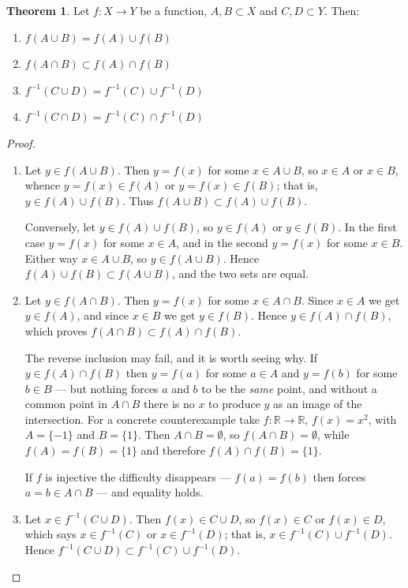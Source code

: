\documentclass[11pt,a4paper]{article}
\theoremstyle{definition}
\newtheorem{thm}{Theorem}[subsection]
\begin{document}
\begin{thm}\label{thm:image-props}
Let $f:X\longrightarrow Y$ be a function, $A,B\subset X$ and $C,D\subset Y$.
Then:
\begin{enumerate}
\item $f(A\cup B)=f(A)\cup f(B)$
\item $f(A\cap B)\subset f(A)\cap f(B)$
\item $f^{-1}(C\cup D)=f^{-1}(C)\cup f^{-1}(D)$
\item $f^{-1}(C\cap D)=f^{-1}(C)\cap f^{-1}(D)$
\end{enumerate}
\end{thm}

\begin{proof}
\begin{enumerate}
\item Let $y\in f(A\cup B)$. Then $y=f(x)$ for some $x\in A\cup B$, so $x\in A$
or $x\in B$, whence $y=f(x)\in f(A)$ or $y=f(x)\in f(B)$; that is,
$y\in f(A)\cup f(B)$. Thus $f(A\cup B)\subset f(A)\cup f(B)$.

Conversely, let $y\in f(A)\cup f(B)$, so $y\in f(A)$ or $y\in f(B)$. In the
first case $y=f(x)$ for some $x\in A$, and in the second $y=f(x)$ for some
$x\in B$. Either way $x\in A\cup B$, so $y\in f(A\cup B)$. Hence
$f(A)\cup f(B)\subset f(A\cup B)$, and the two sets are equal.

\item Let $y\in f(A\cap B)$. Then $y=f(x)$ for some $x\in A\cap B$. Since
$x\in A$ we get $y\in f(A)$, and since $x\in B$ we get $y\in f(B)$. Hence
$y\in f(A)\cap f(B)$, which proves $f(A\cap B)\subset f(A)\cap f(B)$.

The reverse inclusion may fail, and it is worth seeing why. If
$y\in f(A)\cap f(B)$ then $y=f(a)$ for some $a\in A$ and $y=f(b)$ for some
$b\in B$ --- but nothing forces $a$ and $b$ to be the \emph{same} point, and
without a common point in $A\cap B$ there is no $x$ to produce $y$ as an image
of the intersection. For a concrete counterexample take
$f:\mathbb{R}\to\mathbb{R}$, $f(x)=x^2$, with $A=\{-1\}$ and $B=\{1\}$. Then
$A\cap B=\emptyset$, so $f(A\cap B)=\emptyset$, while
$f(A)=f(B)=\{1\}$ and therefore $f(A)\cap f(B)=\{1\}$.

If $f$ is injective the difficulty disappears --- $f(a)=f(b)$ then forces
$a=b\in A\cap B$ --- and equality holds.

\item Let $x\in f^{-1}(C\cup D)$. Then $f(x)\in C\cup D$, so $f(x)\in C$ or
$f(x)\in D$, which says $x\in f^{-1}(C)$ or $x\in f^{-1}(D)$; that is,
$x\in f^{-1}(C)\cup f^{-1}(D)$. Hence
$f^{-1}(C\cup D)\subset f^{-1}(C)\cup f^{-1}(D)$.


\end{enumerate}
\end{proof}
\end{document}
